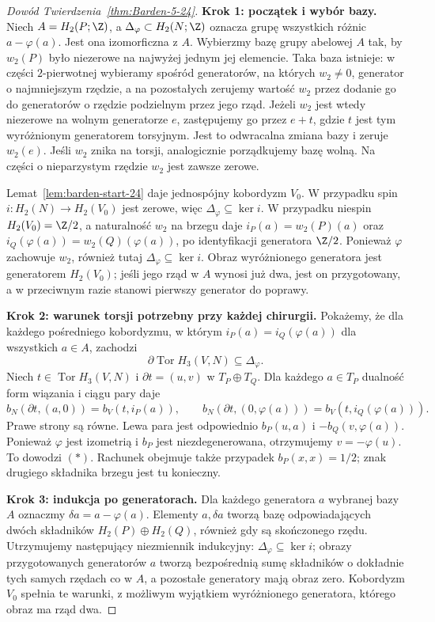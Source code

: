 \begin{proof}[Dowód Twierdzenia~\ref{thm:Barden-5-24}]
\textbf{Krok 1: początek i wybór bazy.}
Niech $A=H_2(P;\Z)$, a
$\Delta_\varphi\subset H_2(N;\Z)$
oznacza grupę wszystkich różnic
$a-\varphi(a)$. Jest ona izomorficzna
z $A$. Wybierzmy bazę grupy abelowej
$A$ tak, by $w_2(P)$ było niezerowe
na najwyżej jednym jej elemencie.
Taka baza istnieje: w części
$2$-pierwotnej wybieramy spośród
generatorów, na których $w_2\ne0$,
generator o najmniejszym rzędzie,
a na pozostałych zerujemy wartość
$w_2$ przez dodanie go do generatorów
o rzędzie podzielnym przez jego rząd.
Jeżeli $w_2$ jest wtedy niezerowe
na wolnym generatorze $e$, zastępujemy
go przez $e+t$, gdzie $t$ jest tym
wyróżnionym generatorem torsyjnym.
Jest to odwracalna zmiana bazy i
zeruje $w_2(e)$.
Jeśli $w_2$ znika na torsji,
analogicznie porządkujemy bazę wolną.
Na części o nieparzystym rzędzie
$w_2$ jest zawsze zerowe.

Lemat~\ref{lem:barden-start-24} daje
jednospójny kobordyzm $V_0$.
W przypadku spin $i\colon H_2(N)\to
H_2(V_0)$ jest zerowe, więc
$\Delta_\varphi\subseteq\ker i$.
W przypadku niespin $H_2(V_0)=\Z/2$,
a naturalność $w_2$ na brzegu daje
$i_P(a)=w_2(P)(a)$ oraz
$i_Q(\varphi(a))=w_2(Q)(\varphi(a))$,
po identyfikacji generatora $\Z/2$.
Ponieważ $\varphi$ zachowuje $w_2$,
również tutaj
$\Delta_\varphi\subseteq\ker i$.
Obraz wyróżnionego generatora jest
generatorem $H_2(V_0)$; jeśli jego
rząd w $A$ wynosi już dwa, jest on
przygotowany, a w przeciwnym razie
stanowi pierwszy generator do poprawy.

\textbf{Krok 2: warunek torsji potrzebny
przy każdej chirurgii.}
Pokażemy, że dla każdego pośredniego
kobordyzmu, w którym
$i_P(a)=i_Q(\varphi(a))$ dla wszystkich
$a\in A$, zachodzi
\[
 \partial\operatorname{Tor}H_3(V,N)
 \subseteq\Delta_\varphi.
 \tag{$*$}
\]
Niech $t\in\operatorname{Tor}H_3(V,N)$
i $\partial t=(u,v)$ w
$T_P\oplus T_Q$. Dla każdego
$a\in T_P$ dualność form wiązania
i ciągu pary daje
\[
 b_N(\partial t,(a,0))
   =b_V(t,i_P(a)),\qquad
 b_N(\partial t,(0,\varphi(a)))
   =b_V(t,i_Q(\varphi(a))).
\]
Prawe strony są równe. Lewa para
jest odpowiednio
$b_P(u,a)$ i $-b_Q(v,\varphi(a))$.
Ponieważ $\varphi$ jest izometrią
i $b_P$ jest niezdegenerowana,
otrzymujemy $v=-\varphi(u)$.
To dowodzi $(*)$. Rachunek obejmuje
także przypadek $b_P(x,x)=1/2$;
znak drugiego składnika brzegu
jest tu konieczny.

\textbf{Krok 3: indukcja po generatorach.}
Dla każdego generatora $a$ wybranej
bazy $A$ oznaczmy
$\delta a=a-\varphi(a)$.
Elementy $a,\delta a$ tworzą bazę
odpowiadających dwóch składników
$H_2(P)\oplus H_2(Q)$, również gdy
są skończonego rzędu. Utrzymujemy
następujący niezmiennik indukcyjny:
$\Delta_\varphi\subseteq\ker i$;
obrazy przygotowanych generatorów
$a$ tworzą bezpośrednią sumę
składników o dokładnie tych samych
rzędach co w $A$, a pozostałe
generatory mają obraz zero.
Kobordyzm $V_0$ spełnia te warunki,
z możliwym wyjątkiem wyróżnionego
generatora, którego obraz ma rząd dwa.


\end{proof}
